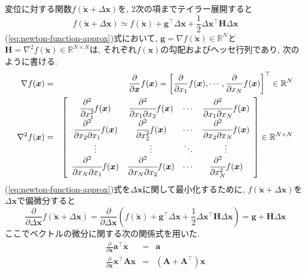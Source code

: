 \documentclass[dvipdfmx,a4paper]{jsarticle}
\begin{document}
変位に対する関数$f(\breve{\bm{x}} + \Delta \bm{x})$を, 2次の項までテイラー展開すると
\begin{equation} \label{eq:newton-function-approx}
    f(\breve{\bm{x}} + \Delta \bm{x})
    \simeq f(\breve{\bm{x}}) + \bm{g}^\top \Delta \bm{x}
    + \frac{1}{2} \Delta \bm{x}^\top \bm{H} \Delta \bm{x}
\end{equation}
(\ref{eq:newton-function-approx})式において, $\bm{g} = \nabla f(\breve{\bm{x}}) \in \mathbb{R}^N$と$\bm{H} = \nabla^2 f(\breve{\bm{x}}) \in \mathbb{R}^{N \times N}$は, それぞれ$f(\bm{x})$の勾配およびヘッセ行列であり, 次のように書ける.
\begin{eqnarray}
    \nabla f(\bm{x})
    &=& \frac{\partial}{\partial \bm{x}} f(\bm{x})
    = \left[ \frac{\partial}{\partial x_1} f(\bm{x}), \cdots,
    \frac{\partial}{\partial x_N} f(\bm{x}) \right]^\top \in \mathbb{R}^N \\
    \nabla^2 f(\bm{x}) \label{eq:newton-gradient}
    &=& \left[ \begin{array}{cccc}
    \cfrac{\partial^2}{\partial x_1^2} f(\bm{x}) &
    \cfrac{\partial^2}{\partial x_1 \partial x_2} f(\bm{x}) & \cdots &
    \cfrac{\partial^2}{\partial x_1 \partial x_N} f(\bm{x}) \\
    \cfrac{\partial^2}{\partial x_2 \partial x_1} f(\bm{x}) &
    \cfrac{\partial^2}{\partial x_2^2} f(\bm{x}) & \cdots &
    \cfrac{\partial^2}{\partial x_2 \partial x_N} f(\bm{x}) \\
    \vdots & \vdots & \ddots & \vdots \\
    \cfrac{\partial^2}{\partial x_N \partial x_1} f(\bm{x}) &
    \cfrac{\partial^2}{\partial x_N \partial x_2} f(\bm{x}) & \cdots &
    \cfrac{\partial^2}{\partial x_N^2} f(\bm{x}) \end{array} \right]
    \in \mathbb{R}^{N \times N} \label{eq:newton-hessian}
\end{eqnarray}
(\ref{eq:newton-function-approx})式を$\Delta \bm{x}$に関して最小化するために, $f(\breve{\bm{x}} + \Delta \bm{x})$を$\Delta \bm{x}$で偏微分すると
\begin{equation} \label{eq:newton-function-partial}
    \frac{\partial}{\partial \Delta \bm{x}} f(\breve{\bm{x}} + \Delta \bm{x})
    = \frac{\partial}{\partial \Delta \bm{x}} \left(
    f(\breve{\bm{x}}) + \bm{g}^\top \Delta \bm{x}
    + \frac{1}{2} \Delta \bm{x}^\top \bm{H} \Delta \bm{x} \right)
    = \bm{g} + \bm{H} \Delta \bm{x}
\end{equation}
ここでベクトルの微分に関する次の関係式を用いた.
\begin{eqnarray}
    \frac{\partial}{\partial \bm{x}} \bm{a}^\top \bm{x} &=& \bm{a} \\
    \frac{\partial}{\partial \bm{x}} \bm{x}^\top \bm{A} \bm{x} &=& \left( \bm{A} + \bm{A}^\top \right) \bm{x} \label{eq:quadratic-derivative}
\end{eqnarray}
\end{document}
